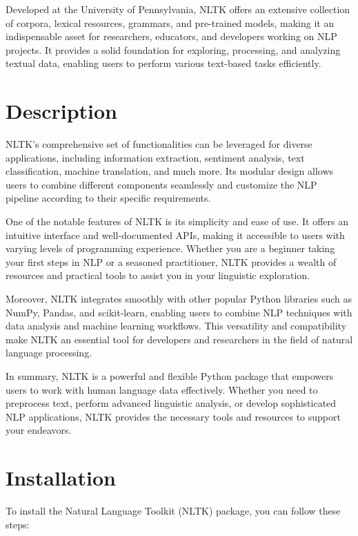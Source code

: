 Developed at the University of Pennsylvania, NLTK offers an extensive collection of corpora, lexical resources, grammars, and pre-trained models, making it an indispensable asset for researchers, educators, and developers working on NLP projects. It provides a solid foundation for exploring, processing, and analyzing textual data, enabling users to perform various text-based tasks efficiently.

\section{Description}

NLTK's comprehensive set of functionalities can be leveraged for diverse applications, including information extraction, sentiment analysis, text classification, machine translation, and much more. Its modular design allows users to combine different components seamlessly and customize the NLP pipeline according to their specific requirements.

One of the notable features of NLTK is its simplicity and ease of use. It offers an intuitive interface and well-documented APIs, making it accessible to users with varying levels of programming experience. Whether you are a beginner taking your first steps in NLP or a seasoned practitioner, NLTK provides a wealth of resources and practical tools to assist you in your linguistic exploration.

Moreover, NLTK integrates smoothly with other popular Python libraries such as NumPy, Pandas, and scikit-learn, enabling users to combine NLP techniques with data analysis and machine learning workflows. This versatility and compatibility make NLTK an essential tool for developers and researchers in the field of natural language processing.

In summary, NLTK is a powerful and flexible Python package that empowers users to work with human language data effectively. Whether you need to preprocess text, perform advanced linguistic analysis, or develop sophisticated NLP applications, NLTK provides the necessary tools and resources to support your endeavors.

\section{Installation}

To install the Natural Language Toolkit (NLTK) package, you can follow these steps: 

\bigskip

